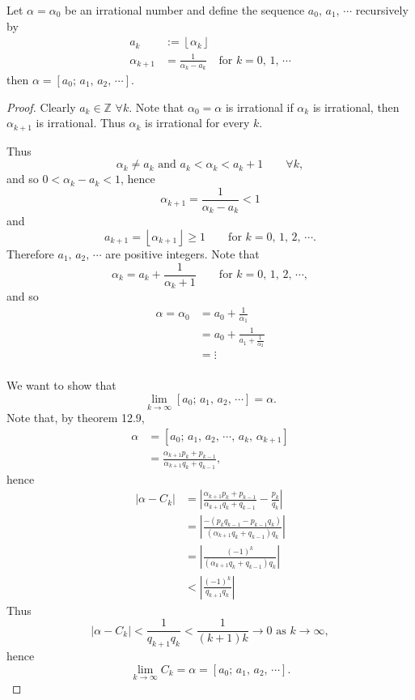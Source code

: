 \begin{theorem}
    Let $\alpha=\alpha_0$ be an irrational number and define the sequence
    $a_0,\,a_1,\,\cdots$ recursively by
    \begin{align*}
        a_k &:= \left\lfloor\alpha_k\right\rfloor \\
        \alpha_{k+1} &= \frac{1}{\alpha_k-a_k} & \mbox{for } k=0,\,1,\,\cdots
    \end{align*}
    then $\alpha=\left[a_0;\,a_1,\,a_2,\,\cdots\right]$.
\end{theorem}

\begin{proof}
    Clearly $a_k \in \mathbb{Z}$ $\forall k$. Note that $\alpha_0=\alpha$ is
    irrational if $\alpha_k$ is irrational, then $\alpha_{k+1}$ is irrational.
    Thus $\alpha_k$ is irrational for every $k$.

    Thus
    \[
        \alpha_k \neq a_k\mbox{ and }a_k<\alpha_k<a_k + 1 \qquad \forall k,
    \]
    and so
    $0 < \alpha_k-a_k < 1$, hence 
    \[
        \alpha_{k+1}=\frac{1}{\alpha_k-a_k} < 1
    \]
    and
    \[
        a_{k+1}=\left\lfloor\alpha_{k+1}\right\rfloor \geq 1 \qquad \mbox{for } k=0,\,1,\,2,\,\cdots.
    \]
    Therefore $a_1,\,a_2,\,\cdots$ are positive integers.
    Note that
    \[
        \alpha_k=a_k+\frac{1}{\alpha_k+1} \qquad \mbox{for } k=0,\,1,\,2,\,\cdots,
    \]
    and so
    \begin{align*}
        \alpha=\alpha_0&=a_0+\frac{1}{\alpha_1} \\
        &= a_0+\frac{1}{a_1+\frac{1}{\alpha_2}} \\
        &= \vdots \\
    \end{align*}

    We want to show that
    \[
        \lim_{k \rightarrow \infty} \left[a_0;\,a_1,\,a_2,\,\cdots\right] = \alpha.
    \]
    Note that, by theorem 12.9,
    \begin{align*}
        \alpha&=\left[a_0;\,a_1,\,a_2,\,\cdots,\,a_k,\,\alpha_{k+1}\right]\\
        &=\frac{\alpha_{k+1}p_k+p_{k-1}}{\alpha_{k+1}q_k+q_{k-1}},
    \end{align*}
    hence
    \begin{align*}
        \left|\alpha-C_k\right| &= \left|\frac{\alpha_{k+1}p_k+p_{k-1}}{\alpha_{k+1}q_k+q_{k-1}}-\frac{p_k}{q_k}\right| \\
        &= \left|\frac{-\left(p_kq_{k-1}-p_{k-1}q_k\right)}{\left(\alpha_{k+1}q_k+q_{k-1}\right)q_k}\right| \\
        &= \left|\frac{\left(-1\right)^k}{\left(\alpha_{k+1}q_k+q_{k-1}\right)q_k}\right| \\
        &< \left|\frac{\left(-1\right)^k}{q_{k+1}q_k}\right|
    \end{align*}
    Thus
    \[
        \left|\alpha-C_k\right|<\frac{1}{q_{k+1}q_k}<\frac{1}{\left(k+1\right)k} \rightarrow 0 \mbox{ as } k \rightarrow \infty,
    \]
    hence
    \[
        \lim_{k\rightarrow \infty} C_k = \alpha = \left[a_0;\,a_1,\,a_2,\,\cdots\right].
    \]
\end{proof}

